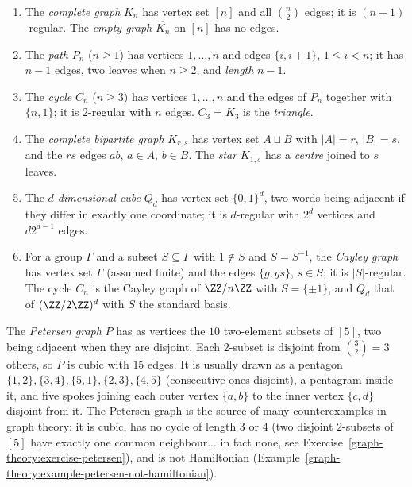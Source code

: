 \begin{example}\label{graph-theory:example-standard}
\begin{enumerate}
\item The \emph{complete graph} $K_n$ has vertex set $[n]$ and all $\binom{n}{2}$ edges; it is $(n - 1)$-regular. The \emph{empty graph} $\overline{K_n}$ on $[n]$ has no edges.
\item The \emph{path} $P_n$ ($n \geq 1$) has vertices $1, \ldots, n$ and edges $\{i, i + 1\}$, $1 \leq i < n$; it has $n - 1$ edges, two leaves when $n \geq 2$, and \emph{length} $n - 1$.
\item The \emph{cycle} $C_n$ ($n \geq 3$) has vertices $1, \ldots, n$ and the edges of $P_n$ together with $\{n, 1\}$; it is $2$-regular with $n$ edges. $C_3 = K_3$ is the \emph{triangle}.
\item The \emph{complete bipartite graph} $K_{r,s}$ has vertex set $A \sqcup B$ with $|A| = r$, $|B| = s$, and the $rs$ edges $ab$, $a \in A$, $b \in B$. The \emph{star} $K_{1,s}$ has a
\emph{centre} joined to $s$ leaves.
\item The \emph{$d$-dimensional cube} $Q_d$ has vertex set $\{0, 1\}^d$, two words being adjacent if they differ in exactly one coordinate; it is $d$-regular with $2^d$ vertices and
$d2^{d-1}$ edges.
\item For a group $\Gamma$ and a subset $S \subseteq \Gamma$ with $1 \notin S$ and $S = S^{-1}$, the \emph{Cayley graph} has vertex set $\Gamma$ (assumed finite) and the edges $\{g, gs\}$,
$s \in S$; it is $|S|$-regular. The cycle $C_n$ is the Cayley graph of $\ZZ/n\ZZ$ with $S = \{\pm 1\}$, and $Q_d$ that of $(\ZZ/2\ZZ)^d$ with $S$ the standard basis.
\end{enumerate}
\end{example}

\begin{example}\label{graph-theory:example-petersen}
The \emph{Petersen graph} $P$ has as vertices the $10$ two-element subsets of $[5]$, two being adjacent when they are disjoint. Each $2$-subset is disjoint from $\binom{3}{2} = 3$ others, so
$P$ is cubic with $15$ edges. It is usually drawn as a pentagon $\{1,2\}, \{3,4\}, \{5,1\}, \{2,3\}, \{4,5\}$ (consecutive ones disjoint), a pentagram inside it, and five spokes joining
each outer vertex $\{a, b\}$ to the inner vertex $\{c, d\}$ disjoint from it. The Petersen graph is the source of many counterexamples in graph theory: it is cubic, has no cycle of length
$3$ or $4$ (two disjoint $2$-subsets of $[5]$ have exactly one common neighbour... in fact none, see Exercise~\ref{graph-theory:exercise-petersen}), and is not Hamiltonian
(Example~\ref{graph-theory:example-petersen-not-hamiltonian}).
\end{example}

